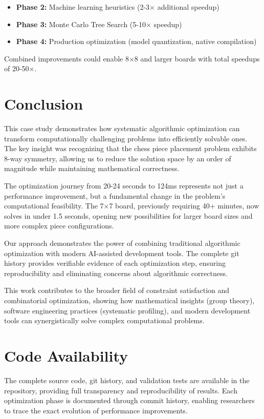 \documentclass[12pt,a4paper]{article}
\theoremstyle{definition}
\begin{document}
\begin{itemize}
\item \textbf{Phase 2:} Machine learning heuristics (2-3× additional speedup)
\item \textbf{Phase 3:} Monte Carlo Tree Search (5-10$\times$ speedup)  
\item \textbf{Phase 4:} Production optimization (model quantization, native compilation)
\end{itemize}

Combined improvements could enable 8$\times$8 and larger boards with total speedups of 20-50×.

\section{Conclusion}

This case study demonstrates how systematic algorithmic optimization can transform computationally challenging problems into efficiently solvable ones. The key insight was recognizing that the chess piece placement problem exhibits 8-way symmetry, allowing us to reduce the solution space by an order of magnitude while maintaining mathematical correctness.

The optimization journey from 20-24 seconds to 124ms represents not just a performance improvement, but a fundamental change in the problem's computational feasibility. The 7$\times$7 board, previously requiring 40+ minutes, now solves in under 1.5 seconds, opening new possibilities for larger board sizes and more complex piece configurations.

Our approach demonstrates the power of combining traditional algorithmic optimization with modern AI-assisted development tools. The complete git history provides verifiable evidence of each optimization step, ensuring reproducibility and eliminating concerns about algorithmic correctness.

This work contributes to the broader field of constraint satisfaction and combinatorial optimization, showing how mathematical insights (group theory), software engineering practices (systematic profiling), and modern development tools can synergistically solve complex computational problems.

\section{Code Availability}

The complete source code, git history, and validation tests are available in the repository, providing full transparency and reproducibility of results. Each optimization phase is documented through commit history, enabling researchers to trace the exact evolution of performance improvements.
\end{document}

